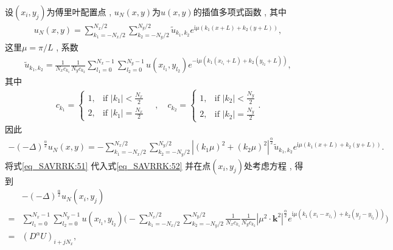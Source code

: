 设$\left(x_{i} , y_{j}\right)$为傅里叶配置点 , $u_{N}(x , y)$为$u(x , y)$的插值多项式函数 , 其中
\begin{align}\label{eq_SAVRRK:50}
u_{N}(x , y)=\sum_{k_{1}=-N_{x} / 2}^{N_{x} / 2} \sum_{k_{2}=-N_{y} / 2}^{N_{y} / 2} \tilde{u}_{k_{1} , k_{2}} e^{\mathrm{i}\mu\left( k_{1} (x+L)+k_{2}(y+L)\right)} , 
\end{align}
这里$\mu={\pi}/{L}$ , 系数
\begin{align}\label{eq_SAVRRK:51}
\tilde{u}_{k_{1} , k_{2}}=\frac{1}{N_{x} c_{k_{1}}} \frac{1}{N_{y} c_{k_{2}}} \sum_{l_1=0}^{N_{x}-1} \sum_{l_2=0}^{N_{y}-1} u(x_{l_1} , y_{l_2}) e^{-\mathrm{i}\mu\left( k_{1}(x_{l_1}+L)+k_{2}(y_{l_2}+L)\right)} , 
\end{align}
其中
\begin{align}c_{k_1} = \begin{cases} 1 , & \text{if } |k_1| < \frac{N_x}{2} \\ 2 , & \text{if } |k_1| = \frac{N_x}{2} \end{cases} \quad  , \quad c_{k_2} = \begin{cases} 1 , & \text{if } |k_2| < \frac{N_y}{2} \\ 2 , & \text{if } |k_2| = \frac{N_y}{2} \end{cases} . \end{align}
因此
\begin{align}\label{eq_SAVRRK:52}
-(-\Delta)^{\frac{\alpha}{2}} u_{N}\left(x , y\right)=-\sum\limits_{k_{1}=-N_{x} / 2}^{N_{x} / 2} \sum\limits_{k_{2}=-N_{y} / 2}^{N_{y} / 2}\left|\left(k_{1} \mu\right)^{2}+\left(k_{2} \mu\right)^{2}\right|^{\frac{\alpha}{2}} \tilde{u}_{k_{1} , k_{2}} e^{\mathrm{i}\mu\left( k_{1} (x+L)+k_{2}(y+L)\right)} . 
\end{align}
将式\eqref{eq_SAVRRK:51} 代入式\eqref{eq_SAVRRK:52} 并在点$(x_i , y_j)$处考虑方程 , 得到
\begin{align}
&-(-\Delta)^{\frac{\alpha}{2}} u_{N}\left(x_{i} , y_{j}\right)\nonumber\\
=&\sum\limits_{l_{1}=0}^{N_{x}-1} \sum\limits_{l_{2}=0}^{N_{y}-1}u(x_{l_{1}} , y_{l_{2}})\Big(-\sum\limits_{k_{1}=-N_{x} / 2}^{N_{x} / 2} \sum\limits_{k_{2}=-N_{y} / 2}^{N_{y} / 2} \frac{1}{N_{x} c_{k_{1}}} \frac{1}{N_{y} c_{k_{2}}}\left|\mu^{2} \cdot \mathbf{k}^{2}\right|^{\frac{\alpha}{2}} e^{\mathrm{i} \mu\left(k_{1}\left(x_{i}-x_{l_{1}}\right)+k_{2}\left(y_{j}-y_{l_{2}}\right)\right)}\Big)\nonumber\\
=&\left(D^{\alpha}U\right)_{i+j N_{x}} , \label{eq_SAVRRK:53}
\end{align}
